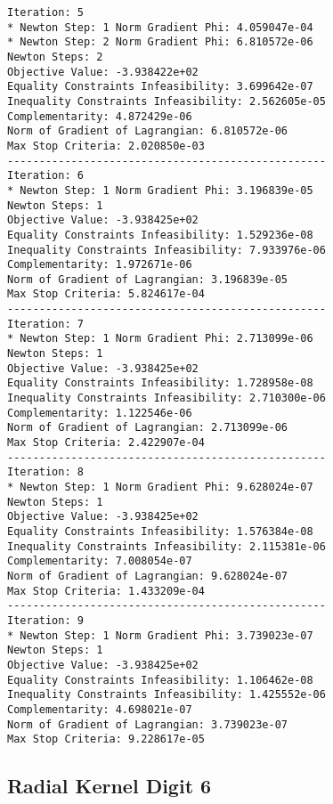 \documentclass{article}
\begin{document}
\begin{minipage}[t]{0.45\textwidth}
\begin{verbatim}
Iteration: 5
* Newton Step: 1 Norm Gradient Phi: 4.059047e-04
* Newton Step: 2 Norm Gradient Phi: 6.810572e-06
Newton Steps: 2
Objective Value: -3.938422e+02
Equality Constraints Infeasibility: 3.699642e-07
Inequality Constraints Infeasibility: 2.562605e-05
Complementarity: 4.872429e-06
Norm of Gradient of Lagrangian: 6.810572e-06
Max Stop Criteria: 2.020850e-03
--------------------------------------------------
Iteration: 6
* Newton Step: 1 Norm Gradient Phi: 3.196839e-05
Newton Steps: 1
Objective Value: -3.938425e+02
Equality Constraints Infeasibility: 1.529236e-08
Inequality Constraints Infeasibility: 7.933976e-06
Complementarity: 1.972671e-06
Norm of Gradient of Lagrangian: 3.196839e-05
Max Stop Criteria: 5.824617e-04
--------------------------------------------------
Iteration: 7
* Newton Step: 1 Norm Gradient Phi: 2.713099e-06
Newton Steps: 1
Objective Value: -3.938425e+02
Equality Constraints Infeasibility: 1.728958e-08
Inequality Constraints Infeasibility: 2.710300e-06
Complementarity: 1.122546e-06
Norm of Gradient of Lagrangian: 2.713099e-06
Max Stop Criteria: 2.422907e-04
--------------------------------------------------
Iteration: 8
* Newton Step: 1 Norm Gradient Phi: 9.628024e-07
Newton Steps: 1
Objective Value: -3.938425e+02
Equality Constraints Infeasibility: 1.576384e-08
Inequality Constraints Infeasibility: 2.115381e-06
Complementarity: 7.008054e-07
Norm of Gradient of Lagrangian: 9.628024e-07
Max Stop Criteria: 1.433209e-04
--------------------------------------------------
Iteration: 9
* Newton Step: 1 Norm Gradient Phi: 3.739023e-07
Newton Steps: 1
Objective Value: -3.938425e+02
Equality Constraints Infeasibility: 1.106462e-08
Inequality Constraints Infeasibility: 1.425552e-06
Complementarity: 4.698021e-07
Norm of Gradient of Lagrangian: 3.739023e-07
Max Stop Criteria: 9.228617e-05
\end{verbatim}
\end{minipage}

\subsection{Radial Kernel Digit 6}\label{radial6}
\end{document}
